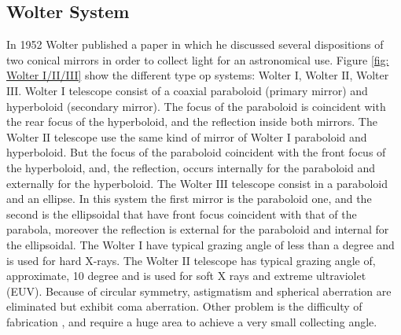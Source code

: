 \subsection{Wolter System} 
\hspace{10mm} In 1952 Wolter published a paper \cite{wolter1975mirror} in which he discussed several dispositions of two conical mirrors in order to collect light for an astronomical use. Figure \ref{fig: Wolter I/II/III} show the different type op systems: Wolter $\mathrm{I} $, Wolter $\mathrm{II} $, Wolter $\mathrm{III} $.\noindent
Wolter $\mathrm{I} $ telescope consist of a coaxial paraboloid (primary mirror) and hyperboloid (secondary mirror). The focus of the paraboloid is coincident with the rear focus of the hyperboloid, and the reflection inside both mirrors. The Wolter $\mathrm{II} $ telescope use the same kind of mirror of Wolter $\mathrm{I} $ paraboloid and hyperboloid. But the focus of the paraboloid coincident with the front focus of the hyperboloid, and, the reflection, occurs internally for the paraboloid and externally for the hyperboloid. The Wolter $\mathrm{III} $ telescope consist in a paraboloid and an ellipse. In this system the first mirror is the paraboloid one, and the second is the ellipsoidal that have front focus coincident with that of the parabola, moreover the reflection is external for the paraboloid and internal for the ellipsoidal.
\noindent The Wolter $\mathrm{I} $ have typical grazing angle of less than a degree and is used for hard X-rays. The Wolter $\mathrm{II} $ telescope has typical grazing angle of, approximate, 10 degree and is used for soft X rays and extreme ultraviolet (EUV).
\noindent Because of circular symmetry, astigmatism and spherical aberration are eliminated but  exhibit coma aberration. Other problem is the difficulty of fabrication , and require a huge area to achieve a very small collecting angle.
